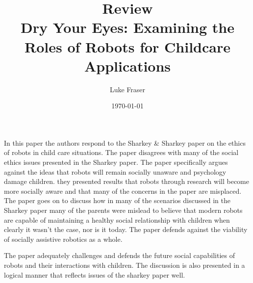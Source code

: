 \documentclass{article}
\begin{document}
\title{{\large Review} \\ Dry Your Eyes: Examining the Roles of Robots for Childcare Applications}
\author{Luke Fraser}
\date{\today}
\maketitle

\begingroup
\renewcommand{\section}[2]{}


\endgroup

\section*{Summary}
In this paper the authors respond to the Sharkey \& Sharkey paper on the ethics of robots in child care situations. The paper disagrees with many of the social ethics issues presented in the Sharkey paper. The paper specifically argues against the ideas that robots will remain socially unaware and psychology damage children. they presented results that robots through research will become more socially aware and that many of the concerns in the paper are misplaced. The paper goes on to discuss how in many of the scenarios discussed in the Sharkey paper many of the parents were mislead to believe that modern robots are capable of maintaining a healthy social relationship with children when clearly it wasn't the case, nor is it today. The paper defends against the viability of socially assistive robotics as a whole.
\section*{Strengths}
The paper adequately challenges and defends the future social capabilities of robots and their interactions with children. The discussion is also presented in a logical manner that reflects issues of the sharkey paper well.
\section*{Critique}

\cite{Feil-seifer_dryyour}
\end{document}

